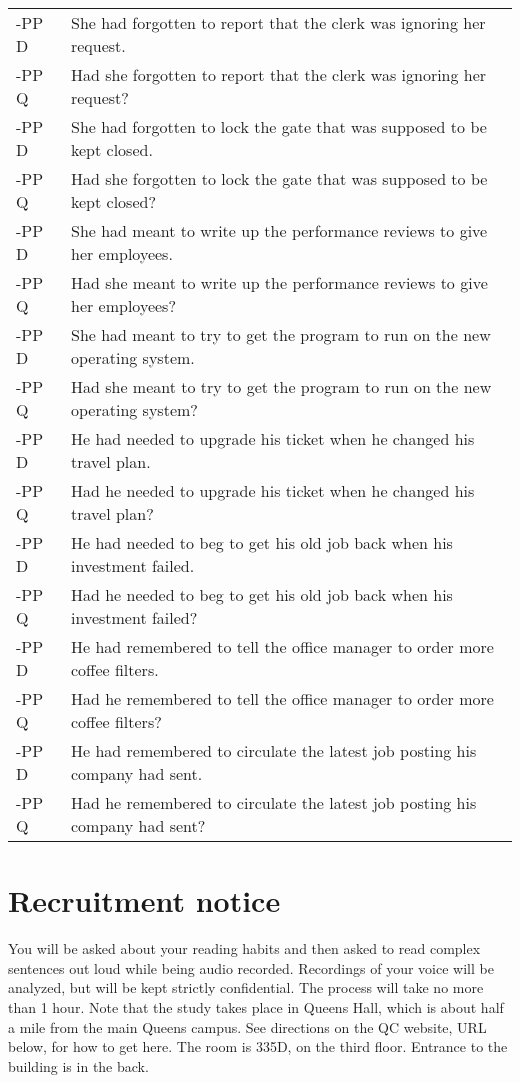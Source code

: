 \documentclass[11pt,oneside]{book}
\begin{document}
\begin{longtable}{ll}
\addlinespace
-PP D & She had forgotten to report that the clerk was ignoring her request.\\
-PP Q & Had she forgotten to report that the clerk was ignoring her request?\\
\addlinespace
-PP D & She had forgotten to lock the gate that was supposed to be kept closed.\\
-PP Q & Had she forgotten to lock the gate that was supposed to be kept closed?\\
\addlinespace
-PP D & She had meant to write up the performance reviews to give her employees.\\
-PP Q & Had she meant to write up the performance reviews to give her employees?\\
\addlinespace
-PP D & She had meant to try to get the program to run on the new operating system.\\
-PP Q & Had she meant to try to get the program to run on the new operating system?\\
\addlinespace
-PP D & He had needed to upgrade his ticket when he changed his travel plan.\\
-PP Q & Had he needed to upgrade his ticket when he changed his travel plan?\\
\addlinespace
-PP D & He had needed to beg to get his old job back when his investment failed.\\
-PP Q & Had he needed to beg to get his old job back when his investment failed?\\
\addlinespace
-PP D & He had remembered to tell the office manager to order more coffee filters.\\
-PP Q & Had he remembered to tell the office manager to order more coffee filters?\\
\addlinespace
-PP D & He had remembered to circulate the latest job posting his company had sent.\\
-PP Q & Had he remembered to circulate the latest job posting his company had sent?\\*
\end{longtable}

\newpage

\hypertarget{rec}{%
\chapter{Recruitment notice}\label{rec}}

You will be asked about your reading habits and then asked to read complex sentences out loud while being audio recorded. Recordings of your voice will be analyzed, but will be kept strictly confidential. The process will take no more than 1 hour. Note that the study takes place in Queens Hall, which is about half a mile from the main Queens campus. See directions on the QC website, URL below, for how to get here. The room is 335D, on the third floor. Entrance to the building is in the back.
\end{document}
